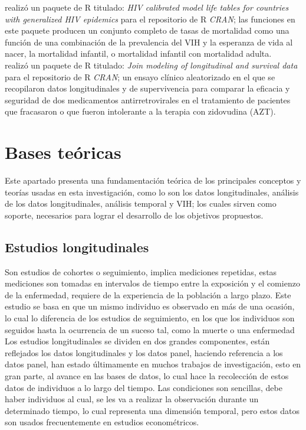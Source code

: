 \citet{life} realiz\'o un paquete de R titulado: \textit{HIV calibrated model life tables for countries with generalized HIV epidemics} para el repositorio de R \textit{CRAN}; las funciones en este paquete producen un conjunto completo de tasas de mortalidad como una funci\'on de una combinaci\'on de la prevalencia del VIH y la esperanza de vida al nacer, la mortalidad infantil, o mortalidad infantil con mortalidad adulta.\\

\citet{jm} realiz\'o un paquete de R titulado: \textit{Join modeling of longitudinal and survival data} para el repositorio de R \textit{CRAN}; un ensayo cl\'inico aleatorizado en el que se recopilaron datos longitudinales y de supervivencia para comparar
la eficacia y seguridad de dos medicamentos antirretrovirales en el tratamiento de pacientes que fracasaron o que fueron intolerante a la terapia con zidovudina (AZT).

\section{Bases te\'oricas}

	Este apartado presenta una fundamentaci\'on te\'orica de los principales conceptos y teor\'ias usadas en esta investigaci\'on, como lo son los datos longitudinales, an\'alisis de los datos longitudinales, an\'alisis temporal y VIH; los cuales sirven como soporte, necesarios para lograr el desarrollo de los objetivos propuestos. 
	
	\subsection{Estudios longitudinales}
	
	Son estudios de cohortes o seguimiento, implica mediciones repetidas, estas mediciones son tomadas en intervalos de tiempo entre la exposici\'on y el comienzo de la enfermedad, requiere de la experiencia de la poblaci\'on a largo plazo. Este estudio se basa en que un mismo individuo es observado en m\'as de una ocasi\'on, lo cual lo diferencia de los estudios de seguimiento, en los que los individuos son seguidos hasta la ocurrencia de un suceso tal, como la muerte o una enfermedad \citet{delgado}\\
	
	Los estudios longitudinales se dividen en dos grandes componentes, est\'an reflejados los datos longitudinales y los datos panel, haciendo referencia a los datos panel, han estado \'ultimamente en muchos trabajos de investigaci\'on, esto en gran parte, al avance en las bases de datos, lo cual hace la recolecci\'on de estos datos de individuos a lo largo del tiempo. Las condiciones son sencillas, debe haber individuos al cual, se les va a realizar la observaci\'on durante un determinado tiempo, lo cual representa una dimensi\'on temporal, pero estos datos son usados frecuentemente en estudios econom\'etricos.\\
	
